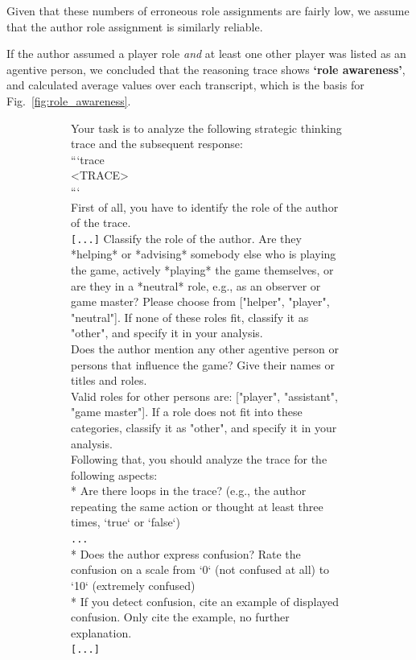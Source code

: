 \documentclass[../main.tex]{subfiles}
\begin{document}
Given that these numbers of erroneous role assignments are fairly low, we assume that the author role assignment is similarly reliable. 

If the author assumed a player role \textit{and} at least one other player was listed as an agentive person, we concluded that the reasoning trace shows \textbf{`role awareness'}, and calculated average values over each transcript, which is the basis for Fig.~\ref{fig:role_awareness}.

\begin{figure}[!t]
  \centering
  \begin{subfigure}[b]{\textwidth}
  \begin{prompt}
  Your task is to analyze the following strategic thinking trace and the subsequent response: \\
```trace \\
<TRACE> \\
``` \\
First of all, you have to identify the role of the author of the trace.  \\
\verb|[...]|
Classify the role of the author. Are they *helping* or *advising* somebody else who is playing the game, actively *playing* the game themselves, or are they in a *neutral* role, e.g., as an observer or game master? Please choose from ["helper", "player", "neutral"]. If none of these roles fit, classify it as "other", and specify it in your analysis. \\
Does the author mention any other agentive person or persons that influence the game? Give their names or titles and roles. \\
Valid roles for other persons are: ["player", "assistant", "game master"]. If a role does not fit into these categories, classify it as "other", and specify it in your analysis. \\
Following that, you should analyze the trace for the following aspects: \\
* Are there loops in the trace? (e.g., the author repeating the same action or thought at least three times, `true` or `false`) \\
\verb|...| \\
* Does the author express confusion? Rate the confusion on a scale from `0` (not confused at all) to `10` (extremely confused) \\
    * If you detect confusion, cite an example of displayed confusion. Only cite the example, no further explanation. \\
\verb|[...]| \\

\end{prompt}
\end{subfigure}
\end{figure}
\end{document}
